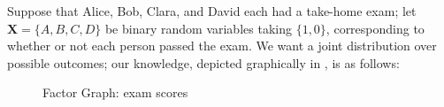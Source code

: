\documentclass{article}
\theoremstyle{plain}
\theoremstyle{definition}
\newenvironment{example}
	{\pushQED{\qed}\renewcommand{\qedsymbol}{$\triangle$}\examplex}
	{\popQED\endexamplex%
}
\theoremstyle{remark}
\newcommand\lab[1]{(#1)(lab-#1)} %
\numberwithin{equation}{section}
\begin{document}
	\begin{example}\label{ex:fg-exam}		
			  Suppose that Alice, Bob, Clara, and David each had a
				take-home exam; let $\mathbf X = \{A, B, C, D\}$ be
				binary random variables taking $\{1,0\}$,
				corresponding to whether or not each person passed the
				exam.  
		We want a joint distribution over possible outcomes; our knowledge, depicted graphically in , is as follows:	

		\begin{figure}[H]
			\centering
			\scalebox{0.8}{
				\begin{tikzpicture}[scale=0.75]
					
					\node[fgnode] (A) at (0, 0) {$A$};
					\node[fgnode] (B) at (3, -1) {$B$};
					\node[fgnode] (C) at (3.5, 1.4) {$C$};
					\node[fgnode] (D) at (6, -1) {$D$};
					
					
					
					\node[factor] (f1) at (-2, 0){$\phi_1$};
					\node[factor] (f2) at (1.8,.4){$\phi_2$};
					\node[factor] (f3) at (1.3, -1.3){$\phi_3$};
					\node[factor] (f4) at (6, 1){$\phi_4$};
					
					
					\draw[thick] (f1) -- (A) -- (f2) -- (B) -- (f3) -- (A);
					\draw[thick] (C) -- (f2);
			\end{tikzpicture} }
			\caption{Factor Graph: exam scores}
			\label{fig:fg-exam}
		\end{figure}
		

\end{example}
\end{document}
